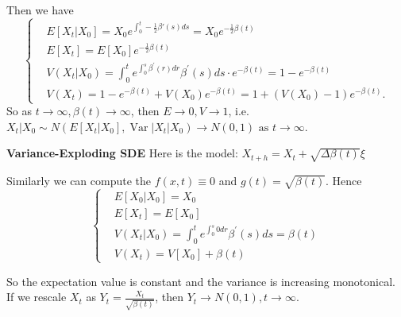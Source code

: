 Then we have
\begin{equation}
    \left\{\begin{aligned}
    &E\left[X_{t} | X_{0}\right]=X_{0} e^{\int_{0}^{t}-\frac{1}{2} \beta'(s) d s}=X_{0} e^{-\frac{1}{2} \beta(t)} \\
    &E\left[X_{t}\right]=E\left[X_{0}\right] e^{-\frac{1}{2} \beta(t)} \\
    &V\left(X_{t} | X_{0}\right)=\int_{0}^{t} e^{\int_{0}^{s} \beta^{\prime}(r) d r} \beta^{\prime}(s) d s \cdot e^{-\beta(t)}=1-e^{-\beta(t)} \\
    &V\left(X_{t}\right)=1-e^{-\beta(t)}+V\left(X_{0}\right) e^{-\beta(t)}=1+\left(V\left(X_{0}\right)-1\right) e^{-\beta(t)} .
    \end{aligned}\right.
\end{equation}
So as  $t \rightarrow \infty,\beta(t) \rightarrow \infty$, then  $E \rightarrow 0, V \rightarrow 1$, i.e. 
$X_{t} | X_{0} \sim N\left(E\left[X_{t} | X_{0}\right], \operatorname{Var}\left|X_{t}\right| X_{0}\right)\rightarrow N(0,1) \text{ as } t \rightarrow \infty$.
 
\textbf{Variance-Exploding SDE}
Here is the model: 
$X_{t+h}=X_{t}+\sqrt{\Delta \beta(t)} \xi$

Similarly we can compute the $f(x, t)\equiv 0$ and $g(t)=\sqrt{\beta(t)}$.
Hence  
\begin{equation}\left\{
    \begin{aligned}
        &E\left[X_{0} | X_{0}\right]=X_{0}\\
        &E\left[X_{t}\right]=E\left[X_{0}\right] \\ 
        &V\left(X_{t} | X_{0}\right)=\int_{0}^{t} e^{\int_{0}^{s} 0 d r} \beta^{\prime}(s) d s=\beta(t)\\ 
        &V\left(X_{t}\right)=V\left[X_{0}\right]+\beta(t)
    \end{aligned}\right.
\end{equation}

So the expectation value is constant and the variance is increasing monotonical. \\
If we rescale  $X_{t}$ as $Y_{t}=\frac{X_{t}}{\sqrt{\beta(t)}}$, then $Y_t \rightarrow N(0,1), t \rightarrow \infty$.

